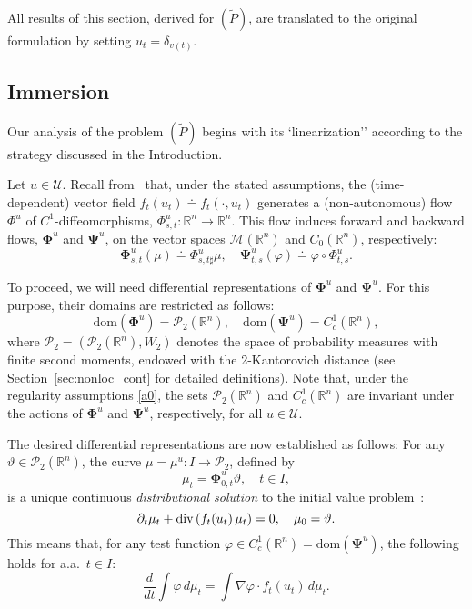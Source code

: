 \documentclass[sn-mathphys-num]{sn-jnl}
\DeclareRobustCommand{\nick}[1]{
\ifthenelse{\boolean{show_comments}}
{\begingroup\color{blue}{[\textbf{Nick:} #1]}\endgroup}
{}
}
\numberwithin{equation}{section}
\theoremstyle{mythm}
\theoremstyle{mydef}
\renewcommand{\phi}{\varphi}
\renewcommand{\div}{\mathop{\rm div}}
\newcommand{\dom}{\mathrm{dom}}
\begin{document}
All results of this section, derived for $(\widetilde{P})$, are  translated to the original formulation by setting \( u_t = \delta_{v(t)} \).


\subsection{%
Immersion}\label{ssec:cnlp}

Our analysis of the problem $(\widetilde P)$ begins with its `linearization'' according to the strategy discussed in the Introduction.

Let \( u \in \mathcal{U} \). Recall from~\cite{ABressan_BPiccoli_2007a} that, under the stated assumptions, the (time-dependent) vector field \( f_t(u_t) \doteq f_t(\cdot, u_t) \) generates a (non-autonomous) flow \( \Phi^{u} \) of \( C^1 \)-diffeomorphisms, \( \Phi^{u}_{s,t} \colon \mathbb{R}^n \to \mathbb{R}^n \). This flow induces forward and backward flows, \( \bm \Phi^{u} \) and \( \bm \Psi^{u} \), on the vector spaces \( \mathcal{M}(\mathbb{R}^n) \) and \( C_0(\mathbb{R}^n) \), respectively:
\begin{equation}
\label{eq:systems}
\bm \Phi^{u}_{s,t}(\mu) \doteq \Phi^{u}_{s,t\sharp} \mu, 
\quad 
\bm \Psi^{u}_{t,s}(\phi) \doteq \phi \circ \Phi^{u}_{t,s}.
\end{equation}

To proceed, we will need differential representations of \( \bm \Phi^{u} \) and \( \bm \Psi^{u} \). For this purpose, their domains are restricted as follows:
\[
\dom(\bm \Phi^{u}) = \mathcal{P}_2(\mathbb{R}^n), \quad \dom(\bm \Psi^{u}) = C^1_c(\mathbb{R}^n),
\]
where \( \mathcal{P}_2 = (\mathcal{P}_2(\mathbb{R}^n), W_2) \) denotes the space of probability measures with finite second moments, endowed with the 2-Kantorovich distance (see Section~\ref{sec:nonloc_cont} for detailed definitions). Note that, under the regularity assumptions \ref{a0}, the sets \( \mathcal{P}_2(\mathbb{R}^n) \) and \( C^1_c(\mathbb{R}^n) \) are invariant under the actions of \( \bm \Phi^{u} \) and \( \bm \Psi^{u} \), respectively, for all \( u \in \mathcal{U} \).

The desired differential representations are now established as follows: For any \( \vartheta \in \mathcal{P}_2(\mathbb{R}^n) \), the curve \( \mu = \mu^u \colon I \to \mathcal{P}_2 \), defined by 
\begin{equation}
\label{LC}
\mu_t = \bm \Phi^{u}_{0,t} \vartheta, \quad t \in I,
\end{equation}
is a unique continuous \emph{distributional solution} to the initial value problem~\cite[Proposition 2.12]{ambrosioGradientFlowsMetric2005}:
\begin{equation}
\label{eq:cont}
\partial_t \mu_t + \div\left(f_t(u_t) \, \mu_t\right) = 0, \quad \mu_0 = \vartheta.
\end{equation}
This means that, for any test function \( \phi \in C^1_c(\mathbb{R}^n) = \dom(\bm \Psi^{u}) \), the following holds for a.a.\ \( t \in I \):
\begin{equation}
    \frac{d}{dt} \int \phi \, d\mu_t = \int \nabla \phi \cdot f_t(u_t) \, d\mu_t.\label{eq:contW}
\end{equation}
\end{document}
